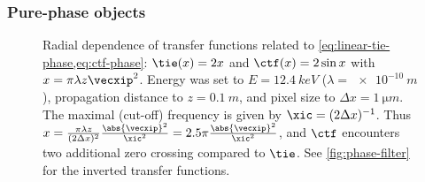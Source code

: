 \documentclass[
twoside,
openright,
titlepage,
numbers=noenddot,
headinclude,
fleqn,
a4paper,
footinclude=true,
cleardoublepage=empty,
abstractoff,
BCOR=5mm,
paper=a4,
fontsize=11pt,
british,ngerman,american,
]{scrreprt}
\begin{document}
\subsubsection{Pure-phase objects}
\label{sec:tie-pure-phase}

\begin{figure} 
  \centering
  \small
  \caption[Linear Transfer functions between phase and
  intensity.]{Radial dependence of transfer functions related to
    \cref{eq:linear-tie-phase,eq:ctf-phase}: $\tie(x) = 2x$ and
    $\ctf(x) = 2\sin x$ with $x=\pi\lambda z\vecxip^2$.  Energy was
    set to $E=\SI{12.4}{keV}$ ($\lambda=\SI{e-10}{m}$), propagation
    distance to $z=\SI{0.1}{m}$, and pixel size to $\Delta x =
    \SI{1}{\micro m}$.  The maximal (cut-off) frequency is given by
    $\xic=(2\Delta x)^{-1}$.  Thus $x=\frac{\pi\lambda z}{(2\Delta
      x)^2}\frac{\abs{\vecxip}^2}{\xic^2} =
    2.5\pi\frac{\abs{\vecxip}^2}{\xic^2}$, and $\ctf$ encounters two
    additional zero crossing compared to $\tie$.  See
    \cref{fig:phase-filter} for the inverted transfer functions.}
  \label{fig:transfer-function}
\end{figure}
\end{document}
